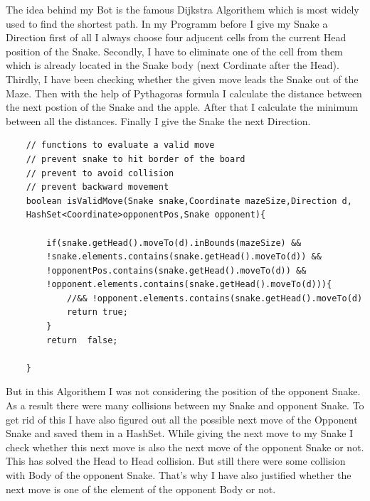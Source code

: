 \documentclass[a4paper,12pt]{article}
\begin{document}
The idea behind my Bot is the famous Dijkstra Algorithem which is most widely used to find the shortest path.
In my Programm before I give my Snake a Direction first of all I  always choose four adjucent cells from the current
Head position of the Snake. Secondly, I have to eliminate one of the cell from them which is already located in the Snake
body (next Cordinate after the Head). Thirdly, I have been checking whether the given move leads the Snake out of the Maze.
Then with the help of Pythagoras formula I calculate the distance between the next postion of the Snake  and the apple.
After that I calculate the minimum between all the distances. Finally I give the Snake the next Direction.
\begin{verbatim}
    // functions to evaluate a valid move
    // prevent snake to hit border of the board
    // prevent to avoid collision
    // prevent backward movement
    boolean isValidMove(Snake snake,Coordinate mazeSize,Direction d,
	HashSet<Coordinate>opponentPos,Snake opponent){

        if(snake.getHead().moveTo(d).inBounds(mazeSize) && 
		!snake.elements.contains(snake.getHead().moveTo(d)) && 
        !opponentPos.contains(snake.getHead().moveTo(d)) && 
		!opponent.elements.contains(snake.getHead().moveTo(d))){
            //&& !opponent.elements.contains(snake.getHead().moveTo(d)
            return true;
        }
        return  false;

    }
\end{verbatim}
But in this Algorithem I was not considering the position of the opponent Snake. As a result there were many collisions between my Snake and opponent 
Snake. To get rid of this I have also figured out all the possible next move of the Opponent Snake and saved them in a HashSet. While giving the next move 
to my Snake I check whether this next move is also the next move of the opponent Snake or not. This has solved the Head to Head collision. But still there were some 
collision with Body of the opponent Snake. That's why I have also justified whether the next move is one of the element of the opponent Body or not.
\end{document}
